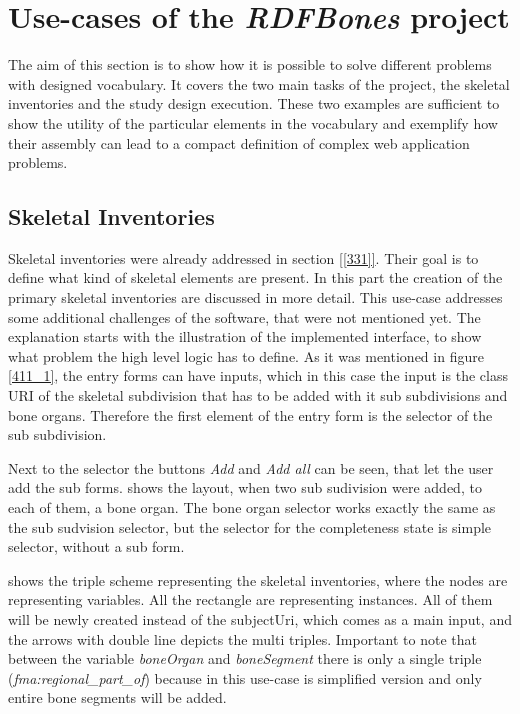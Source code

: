 

\section{Use-cases of the \textit{RDFBones} project}

The aim of this section is to show how it is possible to solve different problems with designed vocabulary. It covers the two main tasks of the project, the skeletal inventories and the study design execution. These two examples are sufficient to show the utility of the particular elements in the vocabulary and exemplify how their assembly can lead to a compact definition of complex web application problems.

\subsection{Skeletal Inventories}

Skeletal inventories were already addressed in section \ref{[331]}. Their goal is to define what kind of skeletal elements are present. In this part the creation of the primary skeletal inventories are discussed in more detail. This use-case addresses some additional challenges of the software, that were not mentioned yet.
The explanation starts with the illustration of the implemented interface, to show what problem the high level logic has to define. As it was mentioned in figure \ref{411_1}, the entry forms can have inputs, which in this case the input is the class URI of the skeletal subdivision that has to be added with it sub subdivisions and bone organs. Therefore the first element of the entry form is the selector of the sub subdivision.


Next to the selector the buttons \textit{Add} and \textit{Add all} can be seen, that let the user add the sub forms.  shows the layout, when two sub sudivision were added, to each of them, a bone organ. The bone organ selector works exactly the same as the sub sudvision selector, but the selector for the completeness state is simple selector, without a sub form. 

 shows the triple scheme representing the skeletal inventories, where the nodes are representing variables. All the rectangle are representing instances. All of them will be newly created instead of the subjectUri, which comes as a main input, and the arrows with double line depicts the multi triples. Important to note that between the variable \textit{boneOrgan} and \textit{boneSegment} there is only a single triple (\textit{fma:regional\_part\_of}) because in this use-case is simplified version and only entire bone segments will be added. 

